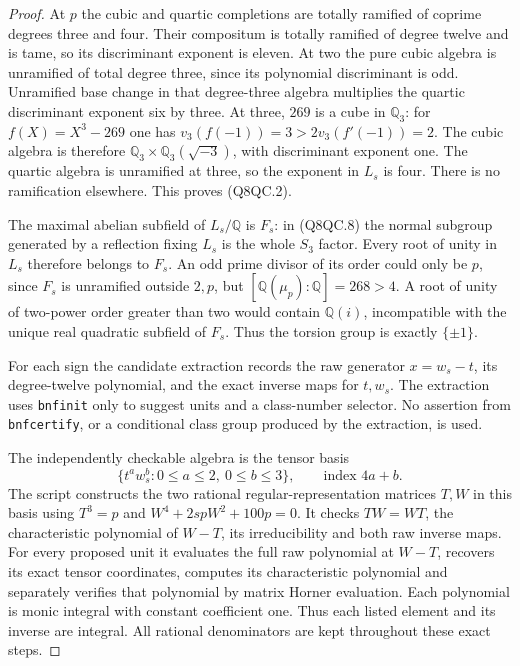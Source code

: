 \begin{proof}
At $p$ the cubic and quartic completions are totally ramified of
coprime degrees three and four.  Their compositum is totally
ramified of degree twelve and is tame, so its discriminant
exponent is eleven.
At two the pure cubic algebra is unramified of total degree
three, since its polynomial discriminant is odd.
Unramified base change in that degree-three algebra multiplies
the quartic discriminant exponent six by three.
At three, $269$ is a cube in $\mathbb Q_3$: for
$f(X)=X^3-269$ one has $v_3(f(-1))=3>2v_3(f'(-1))=2$.
The cubic algebra is therefore
$\mathbb Q_3\times\mathbb Q_3(\sqrt{-3})$, with discriminant
exponent one.  The quartic algebra is unramified at three,
so the exponent in $L_s$ is four.
There is no ramification elsewhere.  This proves (Q8QC.2).

The maximal abelian subfield of $L_s/\mathbb Q$ is $F_s$:
in (Q8QC.8) the normal subgroup generated by a reflection
fixing $L_s$ is the whole $S_3$ factor.
Every root of unity in $L_s$ therefore belongs to $F_s$.
An odd prime divisor of its order could only be $p$, since
$F_s$ is unramified outside $2,p$, but
$[\mathbb Q(\mu_p):\mathbb Q]=268>4$.
A root of unity of two-power order greater than two would
contain $\mathbb Q(i)$, incompatible with the unique real
quadratic subfield of $F_s$.
Thus the torsion group is exactly $\{\pm1\}$.

For each sign the candidate extraction records the raw generator
$x=w_s-t$, its degree-twelve polynomial, and the exact inverse
maps for $t,w_s$.
The extraction uses \texttt{bnfinit} only to suggest units and
a class-number selector.
No assertion from \texttt{bnfcertify}, or a conditional class
group produced by the extraction, is used.

The independently checkable algebra is the tensor basis
\[
 \{t^a w_s^b:0\leq a\leq2,\ 0\leq b\leq3\},
 \qquad\text{index }4a+b .
 \tag{Q8QC.9}
\]
The script  constructs the two
rational regular-representation matrices $T,W$ in this basis
using $T^3=p$ and $W^4+2spW^2+100p=0$.
It checks $TW=WT$, the characteristic polynomial of $W-T$,
its irreducibility and both raw inverse maps.
For every proposed unit it evaluates the full raw polynomial
at $W-T$, recovers its exact tensor coordinates, computes its
characteristic polynomial and separately verifies that polynomial
by matrix Horner evaluation.
Each polynomial is monic integral with constant coefficient one.
Thus each listed element and its inverse are integral.
All rational denominators are kept throughout these exact steps.


\end{proof}
